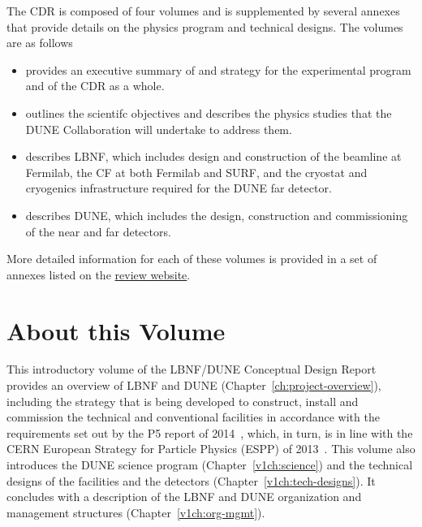 The CDR is composed of four volumes and is supplemented
by several annexes that provide details on the physics program and technical designs. The volumes are as follows

\begin{itemize}
\item \volintro provides an executive summary of and strategy for the experimental program and of the CDR as a whole.
\item \volphys outlines the scientifc objectives and describes the physics studies that the DUNE Collaboration will undertake to address them.
\item \vollbnf describes LBNF, which includes design and construction of the beamline at Fermilab, the CF at both Fermilab and SURF, and the cryostat and cryogenics infrastructure required for the DUNE far detector.
\item \voldune describes DUNE, which includes the design, construction and commissioning of the near and far detectors. 
\end{itemize}

More detailed information for each of these volumes is provided in a set of annexes listed on the \href{https://web.fnal.gov/project/LBNF/ReviewsAndAssessments/LBNF-DUNE%20CD-1-Refresh%20Directors%20Review/SitePages/Home.aspx}{review website}. 



\section{About this Volume}


This introductory volume of the LBNF/DUNE Conceptual Design Report provides an overview of LBNF and
DUNE (Chapter~\ref{ch:project-overview}), including the strategy that is being developed to construct, install and commission the technical and conventional facilities in accordance with the requirements set out by the P5 report of 2014~\cite{p5report2014}, which, in turn, is in line with the CERN
European Strategy for Particle Physics (ESPP) of 2013~\cite{ESPP-2012}. This volume also introduces the DUNE science program (Chapter~\ref{v1ch:science}) and the technical designs of the facilities and the detectors 
(Chapter~\ref{v1ch:tech-designs}). It concludes with a description of the LBNF and DUNE organization and management structures (Chapter~\ref{v1ch:org-mgmt}).


